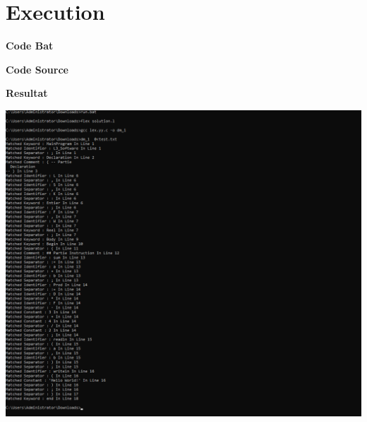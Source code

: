 
\section{Execution}

\textbf{Code Bat}
\vspace{0,25cm}



\newpage
\textbf{Code Source}
\vspace{0.25cm}


\newpage
\textbf{Resultat}

\vspace{0.25cm}

\begin{center}
    \includegraphics[width=\textwidth]{Parts/output.PNG}
\end{center}
